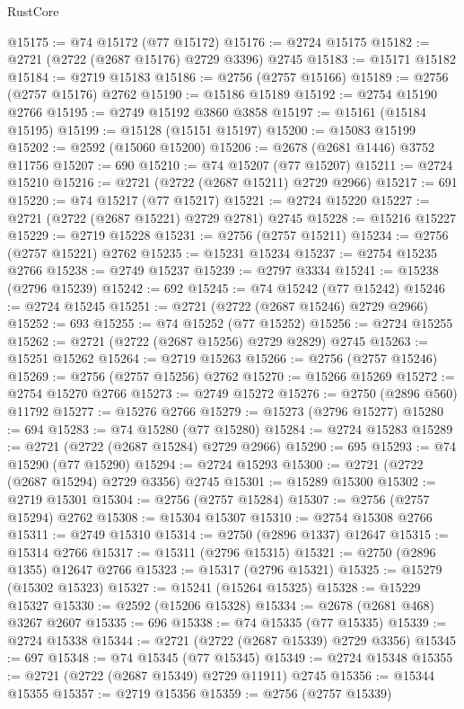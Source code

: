 \begin{lexlean}{RustCore}
\begin{coremodule}
@15175 := @74 @15172 (@77 @15172)
@15176 := @2724 @15175
@15182 := @2721 (@2722 (@2687 @15176) @2729 @3396) @2745
@15183 := @15171 @15182
@15184 := @2719 @15183
@15186 := @2756 (@2757 @15166)
@15189 := @2756 (@2757 @15176) @2762
@15190 := @15186 @15189
@15192 := @2754 @15190 @2766
@15195 := @2749 @15192 @3860 @3858
@15197 := @15161 (@15184 @15195)
@15199 := @15128 (@15151 @15197)
@15200 := @15083 @15199
@15202 := @2592 (@15060 @15200)
@15206 := @2678 (@2681 @1446) @3752 @11756
@15207 := 690
@15210 := @74 @15207 (@77 @15207)
@15211 := @2724 @15210
@15216 := @2721 (@2722 (@2687 @15211) @2729 @2966)
@15217 := 691
@15220 := @74 @15217 (@77 @15217)
@15221 := @2724 @15220
@15227 := @2721 (@2722 (@2687 @15221) @2729 @2781) @2745
@15228 := @15216 @15227
@15229 := @2719 @15228
@15231 := @2756 (@2757 @15211)
@15234 := @2756 (@2757 @15221) @2762
@15235 := @15231 @15234
@15237 := @2754 @15235 @2766
@15238 := @2749 @15237
@15239 := @2797 @3334
@15241 := @15238 (@2796 @15239)
@15242 := 692
@15245 := @74 @15242 (@77 @15242)
@15246 := @2724 @15245
@15251 := @2721 (@2722 (@2687 @15246) @2729 @2966)
@15252 := 693
@15255 := @74 @15252 (@77 @15252)
@15256 := @2724 @15255
@15262 := @2721 (@2722 (@2687 @15256) @2729 @2829) @2745
@15263 := @15251 @15262
@15264 := @2719 @15263
@15266 := @2756 (@2757 @15246)
@15269 := @2756 (@2757 @15256) @2762
@15270 := @15266 @15269
@15272 := @2754 @15270 @2766
@15273 := @2749 @15272
@15276 := @2750 (@2896 @560) @11792
@15277 := @15276 @2766
@15279 := @15273 (@2796 @15277)
@15280 := 694
@15283 := @74 @15280 (@77 @15280)
@15284 := @2724 @15283
@15289 := @2721 (@2722 (@2687 @15284) @2729 @2966)
@15290 := 695
@15293 := @74 @15290 (@77 @15290)
@15294 := @2724 @15293
@15300 := @2721 (@2722 (@2687 @15294) @2729 @3356) @2745
@15301 := @15289 @15300
@15302 := @2719 @15301
@15304 := @2756 (@2757 @15284)
@15307 := @2756 (@2757 @15294) @2762
@15308 := @15304 @15307
@15310 := @2754 @15308 @2766
@15311 := @2749 @15310
@15314 := @2750 (@2896 @1337) @12647
@15315 := @15314 @2766
@15317 := @15311 (@2796 @15315)
@15321 := @2750 (@2896 @1355) @12647 @2766
@15323 := @15317 (@2796 @15321)
@15325 := @15279 (@15302 @15323)
@15327 := @15241 (@15264 @15325)
@15328 := @15229 @15327
@15330 := @2592 (@15206 @15328)
@15334 := @2678 (@2681 @468) @3267 @2607
@15335 := 696
@15338 := @74 @15335 (@77 @15335)
@15339 := @2724 @15338
@15344 := @2721 (@2722 (@2687 @15339) @2729 @3356)
@15345 := 697
@15348 := @74 @15345 (@77 @15345)
@15349 := @2724 @15348
@15355 := @2721 (@2722 (@2687 @15349) @2729 @11911) @2745
@15356 := @15344 @15355
@15357 := @2719 @15356
@15359 := @2756 (@2757 @15339)

\end{coremodule}
\end{lexlean}
